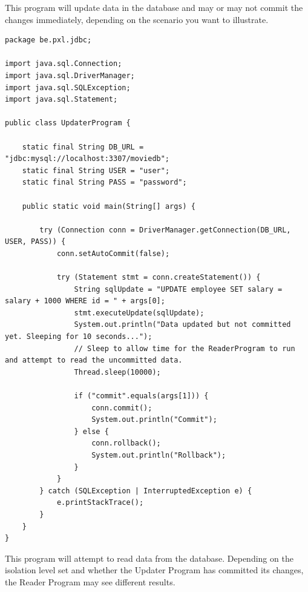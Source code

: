 This program will update data in the database and may or may not commit the changes immediately, depending on the scenario you want to illustrate.

\begin{lstlisting}
package be.pxl.jdbc;

import java.sql.Connection;
import java.sql.DriverManager;
import java.sql.SQLException;
import java.sql.Statement;

public class UpdaterProgram {

	static final String DB_URL = "jdbc:mysql://localhost:3307/moviedb";
	static final String USER = "user";
	static final String PASS = "password";

	public static void main(String[] args) {

		try (Connection conn = DriverManager.getConnection(DB_URL, USER, PASS)) {
			conn.setAutoCommit(false);

			try (Statement stmt = conn.createStatement()) {
				String sqlUpdate = "UPDATE employee SET salary = salary + 1000 WHERE id = " + args[0];
				stmt.executeUpdate(sqlUpdate);
				System.out.println("Data updated but not committed yet. Sleeping for 10 seconds...");
				// Sleep to allow time for the ReaderProgram to run and attempt to read the uncommitted data.
				Thread.sleep(10000);

				if ("commit".equals(args[1])) {
					conn.commit();
					System.out.println("Commit");
				} else {
					conn.rollback();
					System.out.println("Rollback");
				}
			}
		} catch (SQLException | InterruptedException e) {
			e.printStackTrace();
		}
	}
}

\end{lstlisting}


This program will attempt to read data from the database.  Depending on the isolation level set and whether the Updater Program has committed its changes, the Reader Program may see different results.


